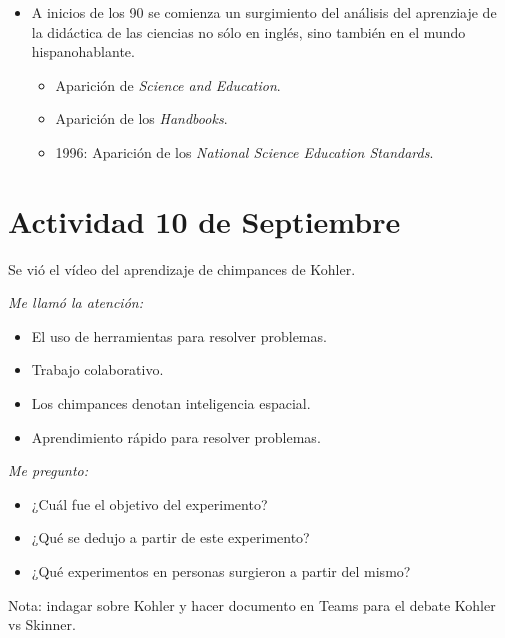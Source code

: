 \documentclass[12pt]{report}
\theoremstyle{largebreak}
\begin{document}
\begin{itemize}
        \item A inicios de los 90 se comienza un surgimiento del análisis del aprenziaje de la didáctica de las ciencias no sólo en inglés, sino también en el mundo hispanohablante.
        \begin{itemize}
            \item Aparición de \textit{Science and Education}.
            \item Aparición de los \textit{Handbooks}.
            \item 1996: Aparición de los \textit{National Science Education Standards}.
        \end{itemize}
    \end{itemize}

    \section{Actividad 10 de Septiembre}

    \begin{obs}
        Se vió el vídeo del aprendizaje de chimpances de Kohler.
    \end{obs}

    \textit{Me llamó la atención:}

    \begin{itemize}
        \item El uso de herramientas para resolver problemas.
        \item Trabajo colaborativo.
        \item Los chimpances denotan inteligencia espacial.
        \item Aprendimiento rápido para resolver problemas.
    \end{itemize}
        
    \textit{Me pregunto:}

    \begin{itemize}
        \item ¿Cuál fue el objetivo del experimento?
        \item ¿Qué se dedujo a partir de este experimento?
        \item ¿Qué experimentos en personas surgieron a partir del mismo?
    \end{itemize}

    \begin{obs}
        Nota: indagar sobre Kohler y hacer documento en Teams para el debate Kohler vs Skinner.
    \end{obs}
\end{document}
